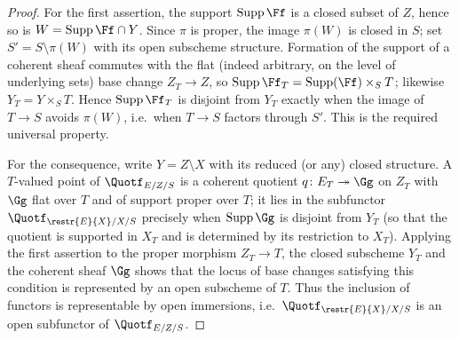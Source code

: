 \begin{proof}
  For the first assertion, the support $\mathrm{Supp}\,\Ff$ is a closed subset of
  $Z$, hence so is $W = \mathrm{Supp}\,\Ff\cap Y$. Since $\pi$ is proper, the image
  $\pi(W)$ is closed in $S$; set $S' = S\setminus \pi(W)$ with its open subscheme
  structure. Formation of the support of a coherent sheaf commutes with the flat
  (indeed arbitrary, on the level of underlying sets) base change $Z_T\to Z$, so
  $\mathrm{Supp}\,\Ff_T = \mathrm{Supp}(\Ff)\times_S T$; likewise
  $Y_T = Y\times_S T$. Hence $\mathrm{Supp}\,\Ff_T$ is disjoint from $Y_T$ exactly
  when the image of $T\to S$ avoids $\pi(W)$, i.e.\ when $T\to S$ factors through
  $S'$. This is the required universal property.

  For the consequence, write $Y = Z\setminus X$ with its reduced (or any) closed
  structure. A $T$-valued point of $\Quotf_{E/Z/S}$ is a coherent quotient
  $q\colon E_T\twoheadrightarrow \Gg$ on $Z_T$ with $\Gg$ flat over $T$ and of
  support proper over $T$; it lies in the subfunctor $\Quotf_{\restr{E}{X}/X/S}$
  precisely when $\mathrm{Supp}\,\Gg$ is disjoint from $Y_T$ (so that the quotient
  is supported in $X_T$ and is determined by its restriction to $X_T$). Applying
  the first assertion to the proper morphism $Z_T\to T$, the closed subscheme
  $Y_T$ and the coherent sheaf $\Gg$ shows that the locus of base changes
  satisfying this condition is represented by an open subscheme of $T$. Thus the
  inclusion of functors is representable by open immersions, i.e.\
  $\Quotf_{\restr{E}{X}/X/S}$ is an open subfunctor of $\Quotf_{E/Z/S}$.
\end{proof}


